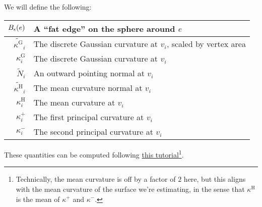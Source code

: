 
We will define the following: \begin{center}\begin{tabular}{r|l}
	\(B_{\epsilon}\pof{e}\) & A ``fat edge'' on the sphere around \(e\) \\ \hline
	\(\widetilde{\kappa^\text{G}}_i\) & The discrete Gaussian curvature at \(v_i\), scaled by vertex area \\ \hline
	\(\kappa^\text{G}_i\) & The discrete Gaussian curvature at \(v_i\) \\ \hline
	\(\widetilde{N}_i\) & An outward pointing normal at \(v_i\) \\ \hline
	\(\widetilde{\kappa^\text{H}}_i\) & The mean curvature normal at \(v_i\) \\ \hline
	\(\kappa^\text{H}_i\) & The mean curvature at \(v_i\) \\ \hline
	\(\kappa^+_i\) & The first principal curvature at \(v_i\) \\ \hline
	\(\kappa^-_i\) & The second principal curvature at \(v_i\)
\end{tabular}\end{center} These quantities can be computed following \href{https://libigl.github.io/libigl-python-bindings/tut-chapter1/}{this tutorial}\footnote{Technically, the mean curvature is off by a factor of \(2\) here, but this aligns with the mean curvature of the surface we're estimating, in the sense that \(\kappa^{\text{H}}\) is the mean of \(\kappa^+\) and \(\kappa^-\).}.

